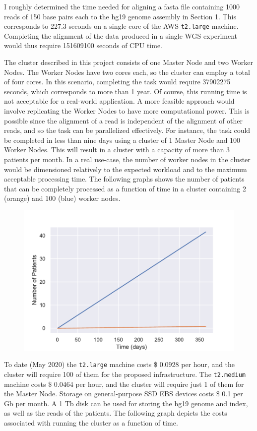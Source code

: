 \documentclass{article}
\begin{document}
I roughly determined the time needed for aligning a fasta file containing 1000 reads of 150 base pairs each to the hg19 genome assembly in Section 1.
This corresponds to 227.3 seconds on a single core of the AWS \texttt{t2.large} machine.
Completing the alignment of the data produced in a single WGS experiment would thus require 151609100 seconds of CPU time.

The cluster described in this project consists of one Master Node and two Worker Nodes.
The Worker Nodes have two cores each, so the cluster can employ a total of four cores.
In this scenario, completing the task would require 37902275 seconds, which corresponds to more than 1 year.
Of course, this running time is not acceptable for a real-world application.
A more feasible approach would involve replicating the Worker Nodes to have more computational power.
This is possible since the alignment of a read is independent of the alignment of other reads, and so the task can be parallelized effectively.
For instance, the task could be completed in less than nine days using a cluster of 1 Master Node and 100 Worker Nodes.
This will result in a cluster with a capacity of more than 3 patients per month.
In a real use-case, the number of worker nodes in the cluster would be dimensioned relatively to the expected workload and to the maximum acceptable processing time.
The following graphs shows the number of patients that can be completely processed as a function of time in a cluster containing 2 (orange) and 100 (blue) worker nodes.

\begin{figure}[!h]
    \center
    \includegraphics[width=.8\textwidth]{./images/patient_graph.pdf}
\end{figure}
\FloatBarrier

To date (May 2020) the \texttt{t2.large} machine costs \$ 0.0928 per hour, and the cluster will require 100 of them for the proposed infrastructure.
The \texttt{t2.medium} machine costs \$ 0.0464 per hour, and the cluster will require just 1 of them for the Master Node.
Storage on general-purpose SSD EBS devices costs \$ 0.1 per Gb per month.
A 1 Tb disk can be used for storing the hg19 genome and index, as well as the reads of the patients.
The following graph depicts the costs associated with running the cluster as a function of time.
\end{document}
